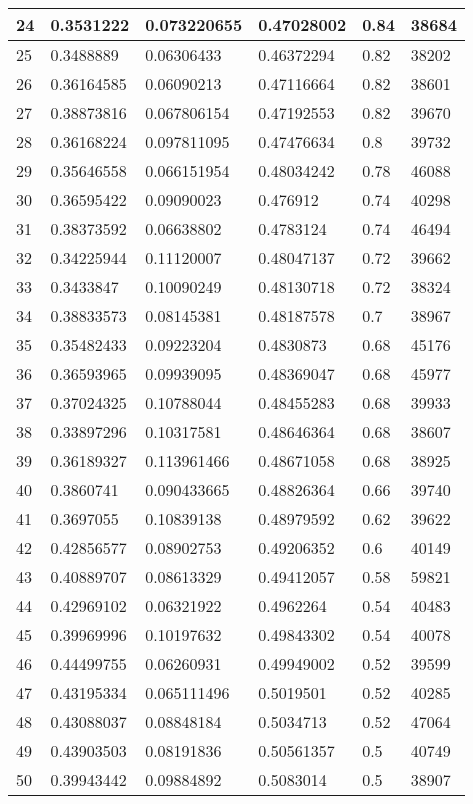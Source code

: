 \begin{longtable}{|l|l|l|l|l|l|}
24 & 0.3531222 & 0.073220655 & 0.47028002 & 0.84 & 38684 \\ \hline 
25 & 0.3488889 & 0.06306433 & 0.46372294 & 0.82 & 38202 \\ \hline 
26 & 0.36164585 & 0.06090213 & 0.47116664 & 0.82 & 38601 \\ \hline 
27 & 0.38873816 & 0.067806154 & 0.47192553 & 0.82 & 39670 \\ \hline 
28 & 0.36168224 & 0.097811095 & 0.47476634 & 0.8 & 39732 \\ \hline 
29 & 0.35646558 & 0.066151954 & 0.48034242 & 0.78 & 46088 \\ \hline 
30 & 0.36595422 & 0.09090023 & 0.476912 & 0.74 & 40298 \\ \hline 
31 & 0.38373592 & 0.06638802 & 0.4783124 & 0.74 & 46494 \\ \hline 
32 & 0.34225944 & 0.11120007 & 0.48047137 & 0.72 & 39662 \\ \hline 
33 & 0.3433847 & 0.10090249 & 0.48130718 & 0.72 & 38324 \\ \hline 
34 & 0.38833573 & 0.08145381 & 0.48187578 & 0.7 & 38967 \\ \hline 
35 & 0.35482433 & 0.09223204 & 0.4830873 & 0.68 & 45176 \\ \hline 
36 & 0.36593965 & 0.09939095 & 0.48369047 & 0.68 & 45977 \\ \hline 
37 & 0.37024325 & 0.10788044 & 0.48455283 & 0.68 & 39933 \\ \hline 
38 & 0.33897296 & 0.10317581 & 0.48646364 & 0.68 & 38607 \\ \hline 
39 & 0.36189327 & 0.113961466 & 0.48671058 & 0.68 & 38925 \\ \hline 
40 & 0.3860741 & 0.090433665 & 0.48826364 & 0.66 & 39740 \\ \hline 
41 & 0.3697055 & 0.10839138 & 0.48979592 & 0.62 & 39622 \\ \hline 
42 & 0.42856577 & 0.08902753 & 0.49206352 & 0.6 & 40149 \\ \hline 
43 & 0.40889707 & 0.08613329 & 0.49412057 & 0.58 & 59821 \\ \hline 
44 & 0.42969102 & 0.06321922 & 0.4962264 & 0.54 & 40483 \\ \hline 
45 & 0.39969996 & 0.10197632 & 0.49843302 & 0.54 & 40078 \\ \hline 
46 & 0.44499755 & 0.06260931 & 0.49949002 & 0.52 & 39599 \\ \hline 
47 & 0.43195334 & 0.065111496 & 0.5019501 & 0.52 & 40285 \\ \hline 
48 & 0.43088037 & 0.08848184 & 0.5034713 & 0.52 & 47064 \\ \hline 
49 & 0.43903503 & 0.08191836 & 0.50561357 & 0.5 & 40749 \\ \hline 
50 & 0.39943442 & 0.09884892 & 0.5083014 & 0.5 & 38907 \\ \hline 
\end{longtable}